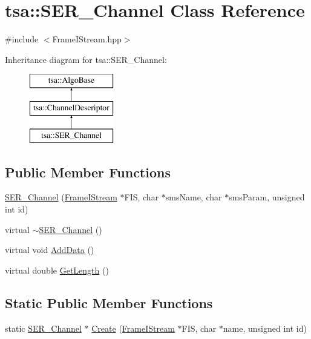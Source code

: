 \hypertarget{classtsa_1_1_s_e_r___channel}{}\section{tsa\+:\+:S\+E\+R\+\_\+\+Channel Class Reference}
\label{classtsa_1_1_s_e_r___channel}


{\ttfamily \#include $<$Frame\+I\+Stream.\+hpp$>$}

Inheritance diagram for tsa\+:\+:S\+E\+R\+\_\+\+Channel\+:\begin{figure}[H]
\begin{center}
\leavevmode
\includegraphics[height=3.000000cm]{classtsa_1_1_s_e_r___channel}
\end{center}
\end{figure}
\subsection*{Public Member Functions}
\begin{DoxyCompactItemize}
\item 
\hyperlink{classtsa_1_1_s_e_r___channel_a9fd72d943a55cf2b6dd6f7116b188be1}{S\+E\+R\+\_\+\+Channel} (\hyperlink{classtsa_1_1_frame_i_stream}{Frame\+I\+Stream} $\ast$F\+IS, char $\ast$sms\+Name, char $\ast$sms\+Param, unsigned int id)
\item 
virtual \hyperlink{classtsa_1_1_s_e_r___channel_a7445edda361e4b3f5381efb687c5aaba}{$\sim$\+S\+E\+R\+\_\+\+Channel} ()
\item 
virtual void \hyperlink{classtsa_1_1_s_e_r___channel_a77efdde9aaa7bbd356088bb1c15e59bf}{Add\+Data} ()
\item 
virtual double \hyperlink{classtsa_1_1_s_e_r___channel_ac2cb2ded2f417590ed1da5c5e2315569}{Get\+Length} ()
\end{DoxyCompactItemize}
\subsection*{Static Public Member Functions}
\begin{DoxyCompactItemize}
\item 
static \hyperlink{classtsa_1_1_s_e_r___channel}{S\+E\+R\+\_\+\+Channel} $\ast$ \hyperlink{classtsa_1_1_s_e_r___channel_a27205b1cfec759cc2922db6dc9d93115}{Create} (\hyperlink{classtsa_1_1_frame_i_stream}{Frame\+I\+Stream} $\ast$F\+IS, char $\ast$name, unsigned int id)
\end{DoxyCompactItemize}
